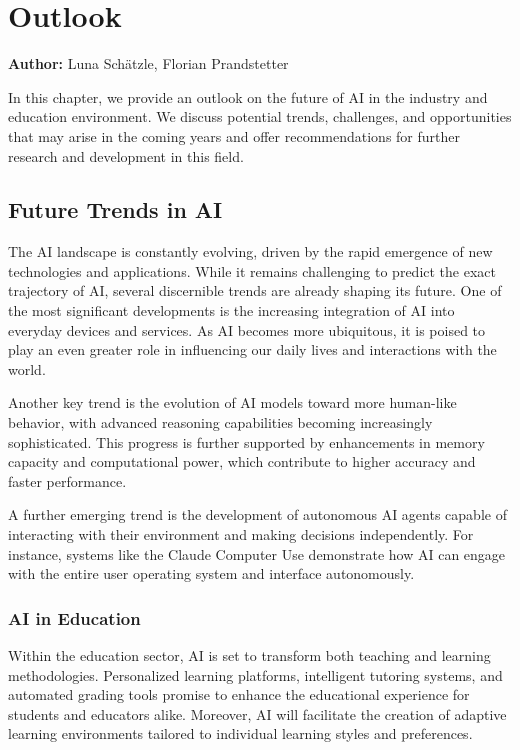 \chapter{Outlook}
\label{chap:Outlook}
\textbf{Author:} Luna Schätzle, Florian Prandstetter 

In this chapter, we provide an outlook on the future of AI in the industry and education environment. We discuss potential trends, challenges, and opportunities that may arise in the coming years and offer recommendations for further research and development in this field.

\section{Future Trends in AI}

The AI landscape is constantly evolving, driven by the rapid emergence of new technologies and applications. While it remains challenging to predict the exact trajectory of AI, several discernible trends are already shaping its future. One of the most significant developments is the increasing integration of AI into everyday devices and services. As AI becomes more ubiquitous, it is poised to play an even greater role in influencing our daily lives and interactions with the world.

Another key trend is the evolution of AI models toward more human-like behavior, with advanced reasoning capabilities becoming increasingly sophisticated. This progress is further supported by enhancements in memory capacity and computational power, which contribute to higher accuracy and faster performance.

A further emerging trend is the development of autonomous AI agents capable of interacting with their environment and making decisions independently. For instance, systems like the Claude Computer Use demonstrate how AI can engage with the entire user operating system and interface autonomously.\cite{Claude-Computer-use}

\subsection{AI in Education}

Within the education sector, AI is set to transform both teaching and learning methodologies. Personalized learning platforms, intelligent tutoring systems, and automated grading tools promise to enhance the educational experience for students and educators alike. Moreover, AI will facilitate the creation of adaptive learning environments tailored to individual learning styles and preferences.

